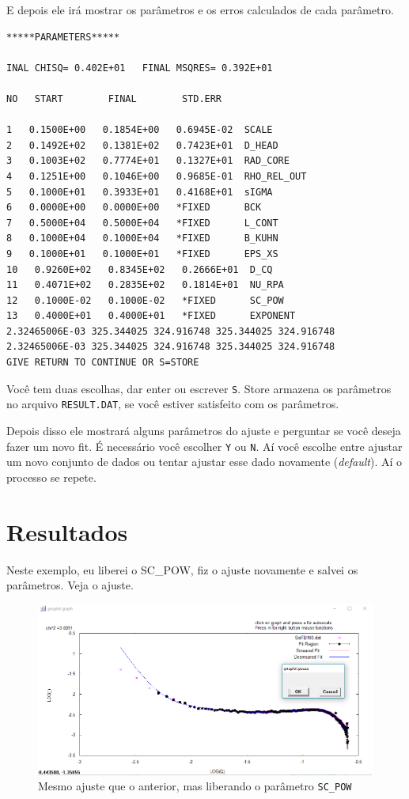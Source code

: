 \begin{apendicesenv}
E depois ele irá mostrar os parâmetros e os erros calculados de cada parâmetro.

\begin{samepage}
\begin{verbatim}
*****PARAMETERS*****

INAL CHISQ= 0.402E+01   FINAL MSQRES= 0.392E+01

NO   START        FINAL        STD.ERR

1   0.1500E+00   0.1854E+00   0.6945E-02  SCALE
2   0.1492E+02   0.1381E+02   0.7423E+01  D_HEAD
3   0.1003E+02   0.7774E+01   0.1327E+01  RAD_CORE
4   0.1251E+00   0.1046E+00   0.9685E-01  RHO_REL_OUT
5   0.1000E+01   0.3933E+01   0.4168E+01  sIGMA
6   0.0000E+00   0.0000E+00   *FIXED      BCK
7   0.5000E+04   0.5000E+04   *FIXED      L_CONT
8   0.1000E+04   0.1000E+04   *FIXED      B_KUHN
9   0.1000E+01   0.1000E+01   *FIXED      EPS_XS
10   0.9260E+02   0.8345E+02   0.2666E+01  D_CQ
11   0.4071E+02   0.2835E+02   0.1814E+01  NU_RPA
12   0.1000E-02   0.1000E-02   *FIXED      SC_POW
13   0.4000E+01   0.4000E+01   *FIXED      EXPONENT
2.32465006E-03 325.344025 324.916748 325.344025 324.916748
2.32465006E-03 325.344025 324.916748 325.344025 324.916748
GIVE RETURN TO CONTINUE OR S=STORE
\end{verbatim}
\end{samepage}

Você tem duas escolhas, dar enter ou escrever \texttt{S}. Store armazena os parâmetros no arquivo \texttt{RESULT.DAT}, se você estiver satisfeito com os parâmetros.

Depois disso ele mostrará alguns parâmetros do ajuste e perguntar se você deseja fazer um novo fit. É necessário você escolher \texttt{Y} ou \texttt{N}. Aí você escolhe entre ajustar um novo conjunto de dados ou tentar ajustar esse dado novamente (\textit{default}). Aí o processo se repete.

\section{Resultados}

Neste exemplo, eu liberei o SC\_POW, fiz o ajuste novamente e salvei os parâmetros. Veja o ajuste.

\begin{figure}
	\centering
	\includegraphics[scale=0.5]{./imagens/saxs/supersaxs_gnuplot_fit2}
	\centering
	\caption{Mesmo ajuste que o anterior, mas liberando o parâmetro \texttt{SC\_POW}}
\end{figure}


\end{apendicesenv}
